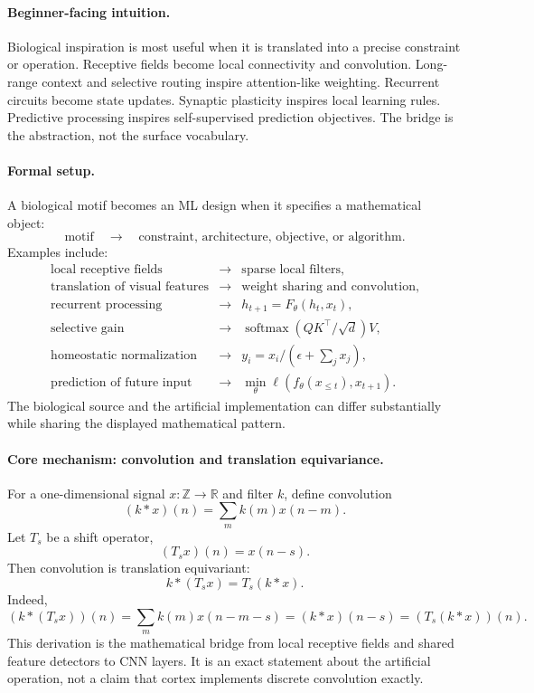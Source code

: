\paragraph{Beginner-facing intuition.}
Biological inspiration is most useful when it is translated into a precise constraint or operation. Receptive fields become local connectivity and convolution. Long-range context and selective routing inspire attention-like weighting. Recurrent circuits become state updates. Synaptic plasticity inspires local learning rules. Predictive processing inspires self-supervised prediction objectives. The bridge is the abstraction, not the surface vocabulary.

\paragraph{Formal setup.}
A biological motif becomes an ML design when it specifies a mathematical object:
\[
\text{motif}\quad\longrightarrow\quad \text{constraint, architecture, objective, or algorithm}.
\]
Examples include:
\[
\begin{array}{lll}
\text{local receptive fields} &\to& \text{sparse local filters},\\
\text{translation of visual features} &\to& \text{weight sharing and convolution},\\
\text{recurrent processing} &\to& h_{t+1}=F_\theta(h_t,x_t),\\
\text{selective gain} &\to& \operatorname{softmax}(QK^\top/\sqrt d)V,\\
\text{homeostatic normalization} &\to& y_i=x_i/(\epsilon+\sum_j x_j),\\
\text{prediction of future input} &\to& \min_\theta \ell(f_\theta(x_{\leq t}),x_{t+1}).
\end{array}
\]
The biological source and the artificial implementation can differ substantially while sharing the displayed mathematical pattern.

\paragraph{Core mechanism: convolution and translation equivariance.}
For a one-dimensional signal \(x:\mathbb Z\to\mathbb R\) and filter \(k\), define convolution
\[
(k*x)(n)=\sum_m k(m)x(n-m).
\]
Let \(T_s\) be a shift operator,
\[
(T_sx)(n)=x(n-s).
\]
Then convolution is translation equivariant:
\[
k*(T_sx)=T_s(k*x).
\]
Indeed,
\[
(k*(T_sx))(n)=\sum_m k(m)x(n-m-s)=(k*x)(n-s)=(T_s(k*x))(n).
\]
This derivation is the mathematical bridge from local receptive fields and shared feature detectors to CNN layers. It is an exact statement about the artificial operation, not a claim that cortex implements discrete convolution exactly.

